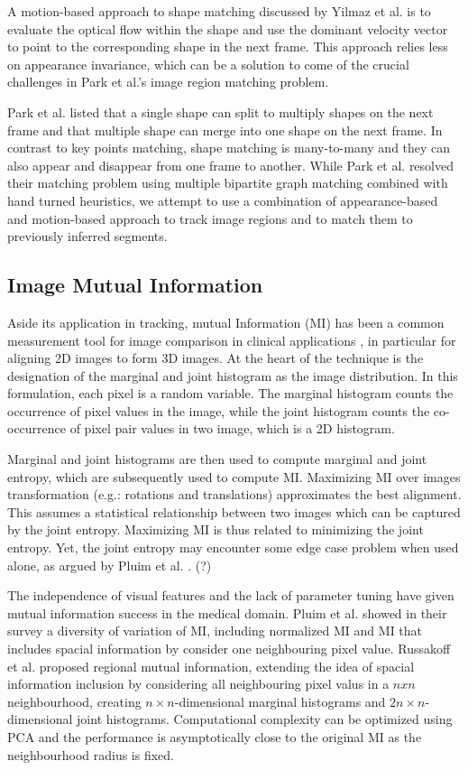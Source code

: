 \documentclass{article}
\begin{document}
A motion-based approach to shape matching discussed by Yilmaz et al. \cite{tracking} is to evaluate the optical flow within the shape and use the dominant velocity vector to point to the corresponding shape in the next frame. This approach relies less on appearance invariance, which can be a solution to come of the crucial challenges in Park et al.'s image region matching problem.

Park et al. \cite{human-action} listed that a single shape can split to multiply shapes on the next frame and that multiple shape can merge into one shape on the next frame. In contrast to key points matching, shape matching is many-to-many and they can also appear and disappear from one frame to another. While Park et al. resolved their matching problem using multiple bipartite graph matching combined with hand turned heuristics, we attempt to use a combination of appearance-based and motion-based approach to track image regions and to match them to previously inferred segments. 

\subsection{Image Mutual Information}

Aside its application in tracking, mutual Information (MI) has been a common measurement tool for image comparison in clinical applications \cite{mi}, in particular for aligning 2D images to form 3D images. At the heart of the technique is the designation of the marginal and joint histogram as the image distribution. In this formulation, each pixel is a random variable. The marginal histogram counts the occurrence of pixel values in the image, while the joint histogram counts the co-occurrence of pixel pair values in two image, which is a 2D histogram. 

Marginal and joint histograms are then used to compute marginal and joint entropy, which are subsequently used to compute MI. Maximizing MI over images transformation (e.g.: rotations and translations) approximates the best alignment. This assumes a statistical relationship between two images which can be captured by the joint entropy. Maximizing MI is thus related to minimizing the joint entropy. Yet, the joint entropy may encounter some edge case problem when used alone, as argued by Pluim et al. \cite{mi}. (?)

The independence of visual features and the lack of parameter tuning have given mutual information success in the medical domain. Pluim et al. showed in their survey a diversity of variation of MI, including normalized MI and MI that includes spacial information by consider one neighbouring pixel value. Russakoff et al. \cite{rmi} proposed regional mutual information, extending the idea of spacial information inclusion by considering all neighbouring pixel valus in a $nxn$ neighbourhood, creating $n\times n$-dimensional marginal histograms and $2n\times n$-dimensional joint histograms. Computational complexity can be optimized using PCA and the performance is asymptotically close to the original MI as the neighbourhood radius is fixed. 
\end{document}
